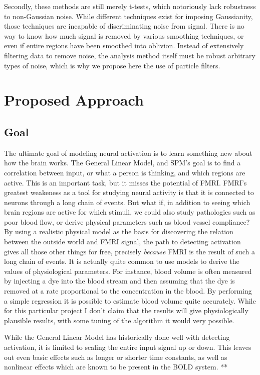 \documentclass{article}
\begin{document}
Secondly, these methods are still merely t-tests, which notoriously
lack robustness to non-Gaussian noise. While different techniques 
exist for imposing Gaussianity, those techniques are incapable of
discriminating noise from signal. There is no way to know how much 
signal is removed
by various smoothing techniques, or even if entire regions have been
smoothed into oblivion. Instead of extensively filtering data to 
remove noise, the analysis method itself must be robust arbitrary
types of noise, which is why we propose here the use of particle filters.

\section*{Proposed Approach}
\subsection{Goal}
The ultimate goal of modeling neural activation is to learn something
new about how the brain works. The General Linear Model, and 
SPM's goal is to find a correlation between input, or what a 
person is thinking, and which regions are active. This is an 
important task, but it misses the potential of FMRI. FMRI's 
greatest weakeness as a tool for studying neural activity is that
it is connected to neurons through a long chain of events. But
what if, in addition to seeing which brain regions are active
for which stimuli, we could also study pathologies such as poor
blood flow, or derive physical parameters such as blood vessel
compliance? By using a realistic physical model as the basis for
discovering the relation between the outside world and FMRI 
signal, the path to detecting activation gives all those other
things for free, precisely \emph{because} FMRI is the result of such
a long chain of events. It is actually quite common to use models to derive
the values of physiological parameters. For instance, blood volume
is often measured by injecting a dye into the blood stream and then
assuming that the dye is removed at a rate proportional to the
concentration in the blood. By performing a simple regression it is
possible to estimate blood volume quite accurately. While for
this particular project I don't claim that the results will give 
physiologically plausible results, with some tuning of the algorithm
it would very possible. 

While the General Linear Model has historically done well with
detecting activation, it is limited to scaling the entire input
signal up or down. This leaves out even basic effects such as 
longer or shorter time constants, as well as nonlinear effects which
are known to be present in the BOLD system. 
**
\end{document}
